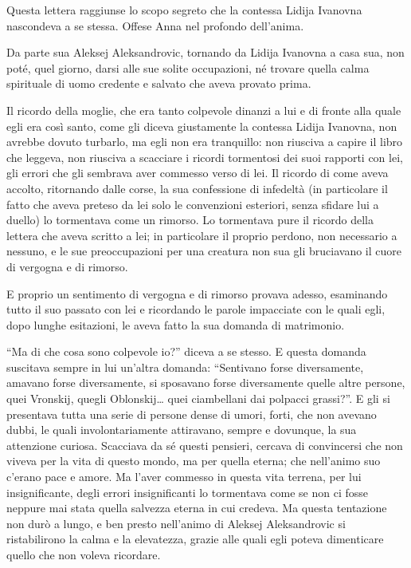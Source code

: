 Questa lettera raggiunse lo scopo segreto che la contessa Lidija Ivanovna nascondeva a se stessa. Offese Anna nel profondo dell'anima. 

Da parte sua Aleksej Aleksandrovic, tornando da Lidija Ivanovna a casa sua, non poté, quel giorno, darsi alle sue solite occupazioni, né trovare quella calma spirituale di uomo credente e salvato che aveva provato prima. 

Il ricordo della moglie, che era tanto colpevole dinanzi a lui e di fronte alla quale egli era così santo, come gli diceva giustamente la contessa Lidija Ivanovna, non avrebbe dovuto turbarlo, ma egli non era tranquillo: non riusciva a capire il libro che leggeva, non riusciva a scacciare i ricordi tormentosi dei suoi rapporti con lei, gli errori che gli sembrava aver commesso verso di lei. Il ricordo di come aveva accolto, ritornando dalle corse, la sua confessione di infedeltà (in particolare il fatto che aveva preteso da lei solo le convenzioni esteriori, senza sfidare lui a duello) lo tormentava come un rimorso. Lo tormentava pure il ricordo della lettera che aveva scritto a lei; in particolare il proprio perdono, non necessario a nessuno, e le sue preoccupazioni per una creatura non sua gli bruciavano il cuore di vergogna e di rimorso. 

E proprio un sentimento di vergogna e di rimorso provava adesso, esaminando tutto il suo passato con lei e ricordando le parole impacciate con le quali egli, dopo lunghe esitazioni, le aveva fatto la sua domanda di matrimonio. 

``Ma di che cosa sono colpevole io?'' diceva a se stesso. E questa domanda suscitava sempre in lui un'altra domanda: ``Sentivano forse diversamente, amavano forse diversamente, si sposavano forse diversamente quelle altre persone, quei Vronskij, quegli Oblonskij\ldots{} quei ciambellani dai polpacci grassi?''. E gli si presentava tutta una serie di persone dense di umori, forti, che non avevano dubbi, le quali involontariamente attiravano, sempre e dovunque, la sua attenzione curiosa. Scacciava da sé questi pensieri, cercava di convincersi che non viveva per la vita di questo mondo, ma per quella eterna; che nell'animo suo c'erano pace e amore. Ma l'aver commesso in questa vita terrena, per lui insignificante, degli errori insignificanti lo tormentava come se non ci fosse neppure mai stata quella salvezza eterna in cui credeva. Ma questa tentazione non durò a lungo, e ben presto nell'animo di Aleksej Aleksandrovic si ristabilirono la calma e la elevatezza, grazie alle quali egli poteva dimenticare quello che non voleva ricordare. 

